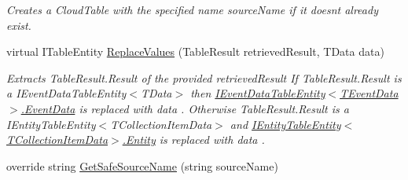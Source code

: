 \begin{DoxyCompactItemize}
\begin{DoxyCompactList}\small\item\em Creates a Cloud\+Table with the specified name {\itshape source\+Name}  if it doesn\textquotesingle{}t already exist. \end{DoxyCompactList}\item 
virtual I\+Table\+Entity \hyperlink{classCqrs_1_1Azure_1_1BlobStorage_1_1TableStorageStore_adc625eceee6e2b190997a771740e01b9_adc625eceee6e2b190997a771740e01b9}{Replace\+Values} (Table\+Result retrieved\+Result, T\+Data data)
\begin{DoxyCompactList}\small\item\em Extracts Table\+Result.\+Result of the provided {\itshape retrieved\+Result}  If Table\+Result.\+Result is a I\+Event\+Data\+Table\+Entity$<$\+T\+Data$>$ then \hyperlink{interfaceCqrs_1_1Azure_1_1BlobStorage_1_1IEventDataTableEntity_aa7b1f06172ce68c2cb2248be422edfe5_aa7b1f06172ce68c2cb2248be422edfe5}{I\+Event\+Data\+Table\+Entity$<$\+T\+Event\+Data$>$.\+Event\+Data} is replaced with {\itshape data} . Otherwise Table\+Result.\+Result is a I\+Entity\+Table\+Entity$<$\+T\+Collection\+Item\+Data$>$ and \hyperlink{interfaceCqrs_1_1Azure_1_1BlobStorage_1_1IEntityTableEntity_a06bd38e994772fa43bf8f456c1b3d6e2_a06bd38e994772fa43bf8f456c1b3d6e2}{I\+Entity\+Table\+Entity$<$\+T\+Collection\+Item\+Data$>$.\+Entity} is replaced with {\itshape data} . \end{DoxyCompactList}\item 
override string \hyperlink{classCqrs_1_1Azure_1_1BlobStorage_1_1TableStorageStore_a7b9e49aa8017ff3c55b184b956a150d0_a7b9e49aa8017ff3c55b184b956a150d0}{Get\+Safe\+Source\+Name} (string source\+Name)
\end{DoxyCompactItemize}
